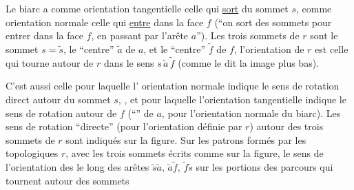 
Le biarc  a comme orientation tangentielle celle qui \uline{sort} du sommet $s$, comme orientation normale celle qui \uline{entre} dans la face $f$ (``on sort des sommets pour entrer dans la face $f$, en passant par l'arête $a$''). Les trois sommets de $r$ sont le sommet $s=\widetilde s$, le ``centre'' $\widetilde a$ de $a$, et le ``centre'' $\widetilde f$ de $f$, l'orientation de $r$ est celle qui tourne autour de $r$ dans le sens $s\,\widetilde a\,\widetilde f$ (comme le dit la  image plus bas).

C'est aussi celle pour laquelle l' orientation normale  indique le sens de rotation direct autour du sommet $s$, , et pour laquelle l'orientation tangentielle indique le sens de rotation autour de $f$ (``'' de $a$, pour l'orientation normale du biarc). Les sens de rotation ``directe'' (pour l'orientation définie par $r$) autour des trois sommets de $r$ sont indiqués sur la figure. Sur les patrons formés par les   topologiques $r$, avec les trois sommets écrits comme sur la figure, le sens de l'orientation des  le long des arêtes $\widetilde s\widetilde a,\,\widetilde a\widetilde f,\,\widetilde f\widetilde s$  sur les portions des parcours qui tournent autour des sommets

